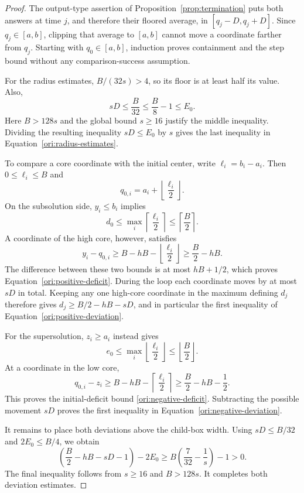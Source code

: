 \begin{proof}
The output-type assertion of Proposition~\ref{prop:termination} puts
both answers at time \(j\), and therefore their floored average,
in \([q_j-D,q_j+D]\). Since \(q_j\in[a,b]\), clipping that average
to \([a,b]\) cannot move a coordinate farther from \(q_j\).
Starting with \(q_0\in[a,b]\), induction proves containment and
the step bound without any comparison-success assumption.

For the radius estimates, \(B/(32s)>4\), so its floor is at least
half its value. Also,
\[
  sD\leq \frac{B}{32}
       \leq \frac B8-1
       \leq E_0.
\]
Here \(B>128s\) and the global bound \(s\geq16\) justify the
middle inequality. Dividing the resulting inequality \(sD\leq E_0\)
by \(s\) gives the last inequality in
Equation~\eqref{ori:radius-estimates}.

To compare a core coordinate with the initial center, write
\(\ell_i=b_i-a_i\). Then \(0\leq\ell_i\leq B\) and
\[
  q_{0,i}=a_i+\left\lfloor\frac{\ell_i}{2}\right\rfloor.
\]
On the subsolution side, \(y_i\leq b_i\) implies
\[
  d_0\leq\max_i\left\lceil\frac{\ell_i}{2}\right\rceil
      \leq\left\lceil\frac B2\right\rceil.
\]
A coordinate of the high core, however, satisfies
\[
  y_i-q_{0,i}
  \geq B-hB-\left\lfloor\frac{\ell_i}{2}\right\rfloor
  \geq \frac B2-hB.
\]
The difference between these two bounds is at most \(hB+1/2\),
which proves Equation~\eqref{ori:positive-deficit}. During the loop
each coordinate moves by at most \(sD\) in total. Keeping any one
high-core coordinate in the maximum defining \(d_j\) therefore gives
\(d_j\geq B/2-hB-sD\), and in particular the first inequality of
Equation~\eqref{ori:positive-deviation}.

For the supersolution, \(z_i\geq a_i\) instead gives
\[
  e_0\leq\max_i\left\lfloor\frac{\ell_i}{2}\right\rfloor
      \leq\left\lfloor\frac B2\right\rfloor.
\]
At a coordinate in the low core,
\[
  q_{0,i}-z_i
  \geq B-hB-\left\lceil\frac{\ell_i}{2}\right\rceil
  \geq \frac B2-hB-\frac12.
\]
This proves the initial-deficit bound
\eqref{ori:negative-deficit}. Subtracting the possible movement
\(sD\) proves the first inequality in
Equation~\eqref{ori:negative-deviation}.

It remains to place both deviations above the child-box width. Using
\(sD\leq B/32\) and \(2E_0\leq B/4\), we obtain
\[
  \left(\frac B2-hB-sD-1\right)-2E_0
  \geq B\left(\frac7{32}-\frac1s\right)-1
  >0.
\]
The final inequality follows from \(s\geq16\) and \(B>128s\).
It completes both deviation estimates.
\end{proof}

